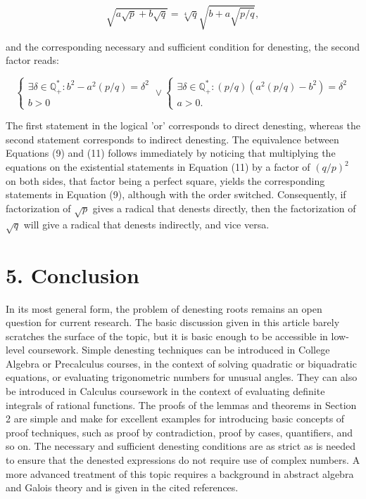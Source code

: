 \documentclass[11pt,letterpaper]{article}
\begin{document}
\begin{equation*}
\sqrt{a \sqrt{p}+b \sqrt{q}}=\sqrt[4]{q} \sqrt{b+a \sqrt{p / q}}, \tag{10}\label{eq:10}
\end{equation*}


and the corresponding necessary and sufficient condition for denesting, the second factor reads:

\[
\left\{\begin{array} { l } 
{ \exists \delta \in \mathbb { Q } _ { + } ^ { * } : b ^ { 2 } - a ^ { 2 } ( p / q ) = \delta ^ { 2 } }  \tag{11}\label{eq:11}\\
{ b > 0 }
\end{array} \vee \left\{\begin{array}{l}
\exists \delta \in \mathbb{Q}_{+}^{*}:(p / q)\left(a^{2}(p / q)-b^{2}\right)=\delta^{2} \\
a>0 .
\end{array}\right.\right.
\]

The first statement in the logical 'or' corresponds to direct denesting, whereas the second statement corresponds to indirect denesting. The equivalence between Equations (9) and (11) follows immediately by noticing that multiplying the equations on the existential statements in Equation (11) by a factor of $(q / p)^{2}$ on both sides, that factor being a perfect square, yields the corresponding statements in Equation (9), although with the order switched. Consequently, if factorization of $\sqrt{p}$ gives a radical that denests directly, then the factorization of $\sqrt{q}$ will give a radical that denests indirectly, and vice versa.

\section*{5. Conclusion}
In its most general form, the problem of denesting roots remains an open question for current research. The basic discussion given in this article barely scratches the surface of the topic, but it is basic enough to be accessible in low-level coursework. Simple denesting techniques can be introduced in College Algebra or Precalculus courses, in the context of solving quadratic or biquadratic equations, or evaluating trigonometric numbers for unusual angles. They can also be introduced in Calculus coursework in the context of evaluating definite integrals of rational functions. The proofs of the lemmas and theorems in Section 2 are simple and make for excellent examples for introducing basic concepts of proof techniques, such as proof by contradiction, proof by cases, quantifiers, and so on. The necessary and sufficient denesting conditions are as strict as is needed to ensure that the denested expressions do not require use of complex numbers. A more advanced treatment of this topic requires a background in abstract algebra and Galois theory and is given in the cited references.
\end{document}
